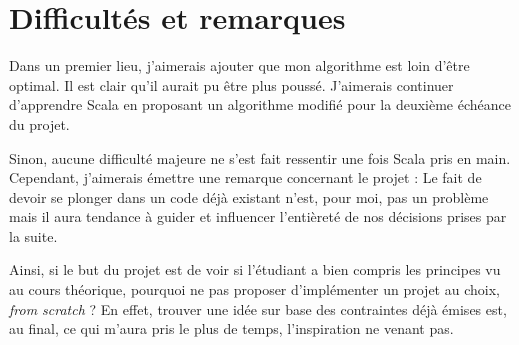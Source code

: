 \section{Difficultés et remarques}
Dans un premier lieu, j'aimerais ajouter que mon algorithme est loin d'être optimal. Il est clair qu'il aurait pu être plus poussé. J'aimerais continuer d'apprendre Scala en proposant un algorithme modifié pour la deuxième échéance du projet.

Sinon, aucune difficulté majeure ne s'est fait ressentir une fois Scala pris en main. Cependant, j'aimerais émettre une remarque concernant le projet :
Le fait de devoir se plonger dans un code déjà existant n'est, pour moi, pas un problème mais il aura tendance à guider et influencer l'entièreté de nos décisions prises par la suite. 

Ainsi, si le but du projet est de voir si l'étudiant a bien compris les principes vu au cours théorique, pourquoi ne pas proposer d'implémenter un projet au choix, \textit{from scratch} ? En effet, trouver une idée sur base des contraintes déjà émises est, au final, ce qui m'aura pris le plus de temps, l'inspiration ne venant pas.